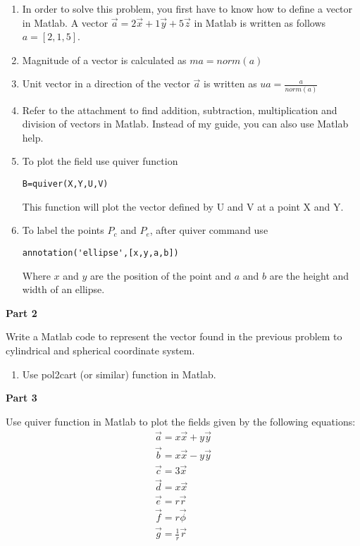 \documentclass[]{report}
\begin{document}
\begin{description}
\begin{enumerate}
\item In order to solve this problem, you first have to know how to define a vector in Matlab. A vector $\vec{a}=2 \vec{x} + 1 \vec{y} + 5 \vec{z}$ in Matlab is written as follows $a=[2,1,5]$.
\item Magnitude of a vector is calculated as $ma=norm(a)$
\item Unit vector in a direction of the vector $\vec{a}$ is written as $ua=\frac{a}{norm(a)}$
\item Refer to the attachment to find addition, subtraction, multiplication and division of vectors in Matlab. Instead of my guide, you can also use Matlab help.
 \item To plot the field use quiver function 
\begin{verbatim}
B=quiver(X,Y,U,V)
\end{verbatim}
This function will plot the vector defined by U and V at a point X and Y.
\item To label the points $P_c$ and $P_e$, after quiver command use
\begin{verbatim}
annotation('ellipse',[x,y,a,b])
\end{verbatim}
Where $x$ and $y$ are the position of the point and $a$ and $b$ are the height and width of an ellipse.

\end{enumerate}


\item{\bf{Part 2}}

Write a Matlab code to represent the vector found in the previous problem to cylindrical and spherical coordinate system. 


\begin{enumerate}
\item Use pol2cart (or similar) function in Matlab.
\end{enumerate}




\item{\bf{Part 3}}

Use quiver function in Matlab to plot the fields given by the following equations:
\begin{eqnarray}
\vec{a} = x \vec{x} + y \vec{y} \\
\vec{b} = x \vec{x} - y \vec{y} \\
\vec{c}= 3 \vec{x} \\
\vec{d} = x \vec{x} \\
\vec{e} = r \vec{r} \\
\vec{f} = r \vec{\phi} \\
\vec{g} =\frac{1}{r} \vec{r}
\end{eqnarray}


\end{description}
\end{document}
